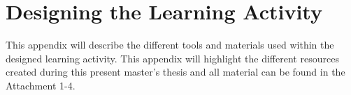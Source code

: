 \chapter{Designing the Learning Activity}
\label{appendix:a_learning}


This appendix will describe the different tools and materials used within the designed learning activity. This appendix will highlight the different resources created during this present master's thesis and all material can be found in the Attachment 1-4.


%




